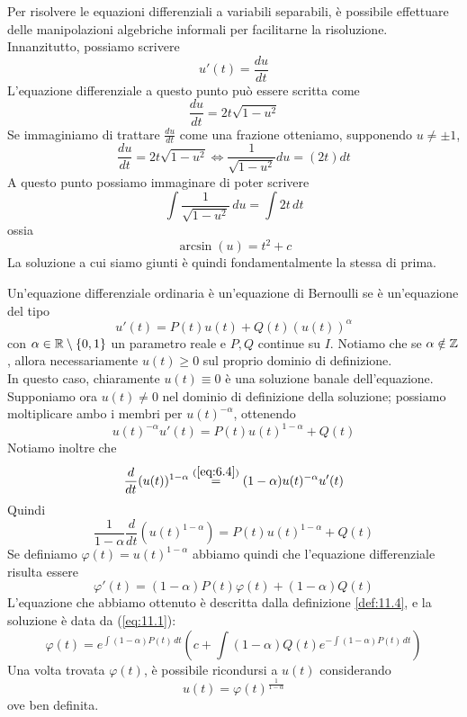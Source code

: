 \begin{remark}
    Per risolvere le equazioni differenziali a variabili separabili, è possibile effettuare delle manipolazioni algebriche informali per facilitarne la risoluzione. Innanzitutto, possiamo scrivere
    \[
    u'(t) = \frac{du}{dt}
    \]
    L'equazione differenziale a questo punto può essere scritta come
    \[
    \frac{du}{dt} = 2t\sqrt{1-u^2} 
    \]
    Se immaginiamo di trattare $\frac{du}{dt}$ come una frazione otteniamo, supponendo $u\ne \pm1$,
    \[
    \frac{du}{dt} = 2t\sqrt{1-u^2} \iff \frac{1}{\sqrt{1-u^2}}du = (2t) dt
    \]
    A questo punto possiamo immaginare di poter scrivere
    \[
    \int \frac{1}{\sqrt{1-u^2}}\, du = \int 2t\, dt
    \]
    ossia
    \[
    \arcsin(u) = t^2+c
    \]
    La soluzione a cui siamo giunti è quindi fondamentalmente la stessa di prima.
\end{remark}
\begin{definition}
    \label{def:11.7}
    Un'equazione differenziale ordinaria è un'equazione di Bernoulli se è un'equazione del tipo
    \[
    u'(t) = P(t)u(t)+Q(t)(u(t))^\alpha
    \]
    con $\alpha\in \amsbb{R}\setminus\{0,1\}$ un parametro reale e $P,Q$ continue su $I$. Notiamo che se $\alpha\notin \amsbb{Z}$, allora necessariamente $u(t)\ge 0$ sul proprio dominio di definizione.\\
    In questo caso, chiaramente $u(t) \equiv 0$ è una soluzione banale dell'equazione. Supponiamo ora $u(t)\ne 0$ nel dominio di definizione della soluzione; possiamo moltiplicare ambo i membri per $u(t)^{-\alpha}$, ottenendo
    \[
    u(t)^{-\alpha} u'(t) = P(t) u(t)^{1-\alpha} + Q(t)
    \]
    Notiamo inoltre che 
    \[
    \frac{d}{dt}(u(t))^{1-\alpha} \overset{(\ref{eq:6.4})}{=} (1-\alpha) u(t)^{-\alpha} u'(t)
    \]
    Quindi
    \[
    \frac{1}{1-\alpha} \frac{d}{dt}(u(t)^{1-\alpha}) = P(t) u(t)^{1-\alpha} + Q(t)
    \]
    Se definiamo $\varphi(t) = u(t)^{1-\alpha}$ abbiamo quindi che l'equazione differenziale risulta essere
    \[
    \varphi'(t) = (1-\alpha)P(t)\varphi(t) + (1-\alpha)Q(t)
    \]
    L'equazione che abbiamo ottenuto è descritta dalla definizione \ref{def:11.4}, e la soluzione è data da (\ref{eq:11.1}):
    \[
    \varphi(t) = e^{\int (1-\alpha)P(t)\, dt} \left(c+\int (1-\alpha)Q(t) e^{-\int(1-\alpha)P(t)\, dt}\right)
    \]
    Una volta trovata $\varphi(t)$, è possibile ricondursi a $u(t)$ considerando 
    \[
    u(t) = \varphi(t)^{\frac{1}{1-\alpha}}
    \]
    ove ben definita.
\end{definition}
